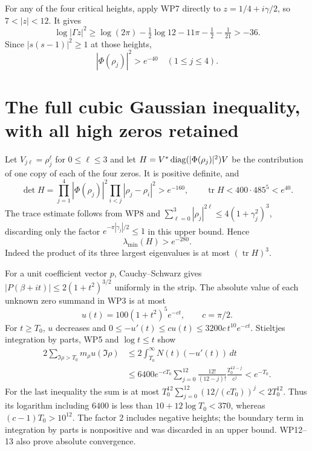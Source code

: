 \documentclass[11pt]{article}
\begin{document}
For any of the four critical heights, apply WP7 directly to
$z=1/4+i\gamma/2$, so $7<|z|<12$. It gives
\[
 \log|\Gamma z|^2\ge
 \log(2\pi)-\tfrac12\log12-11\pi-\tfrac12-\tfrac1{21}>-36.
\]
Since $|s(s-1)|^2\ge1$ at those heights,
\[
             |\Phi(\rho_j)|^2>e^{-40}\quad(1\le j\le4).
                                                                  \tag{WP9}
\]

\section{The full cubic Gaussian inequality, with all high zeros retained}
Let $V_{j\ell}=\rho_j^\ell$ for $0\le\ell\le3$ and let
$H=V^*\operatorname{diag}(|\Phi(\rho_j)|^2)V$ be the contribution of one
copy of each of the four zeros. It is positive definite, and
\[
 \det H=\prod_{j=1}^4|\Phi(\rho_j)|^2
                   \prod_{i<j}|\rho_j-\rho_i|^2>e^{-160},
 \qquad \operatorname{tr}H<400\cdot485^5<e^{40}.              \tag{WP10}
\]
The trace estimate follows from WP8 and
$\sum_{\ell=0}^3|\rho_j|^{2\ell}\le4(1+\gamma_j^2)^3$,
discarding only the factor $e^{-\pi|\gamma_j|/2}\le1$ in this
upper bound. Hence
\[
                         \lambda_{\min}(H)>e^{-280}.           \tag{WP11}
\]
Indeed the product of its three largest eigenvalues is at most
$(\operatorname{tr}H)^3$.

For a unit coefficient vector $p$, Cauchy--Schwarz gives
$|P(\beta+it)|\le2(1+t^2)^{3/2}$ uniformly in the strip.
The absolute value of each unknown zero summand in WP3 is at
most
\[
                  u(t)=100(1+t^2)^5e^{-ct},\qquad c=\pi/2.
                                                                  \tag{WP12}
\]
For $t\ge T_0$, $u$ decreases and
$0\le-u'(t)\le c u(t)\le3200c\,t^{10}e^{-ct}$.
Stieltjes integration by parts, WP5 and $\log t\le t$ show
\[
 \begin{split}
 2\sum_{\Im\rho>T_0}m_\rho u(\Im\rho)
 &\le2\int_{T_0}^{\infty}N(t)(-u'(t))\,dt\\
 &\le6400e^{-cT_0}\sum_{j=0}^{12}
             \frac{12!}{(12-j)!}\frac{T_0^{12-j}}{c^j}
 <e^{-T_0}.
 \end{split}                                                   \tag{WP13}
\]
For the last inequality the sum is at most
$T_0^{12}\sum_{j=0}^{12}(12/(cT_0))^j<2T_0^{12}$.
Thus its logarithm including $6400$ is less than
$10+12\log T_0<370$, whereas $(c-1)T_0>10^{12}$.
The factor $2$ includes negative heights; the boundary term in
integration by parts is nonpositive and was discarded in an
upper bound. WP12--13 also prove absolute convergence.
\end{document}
